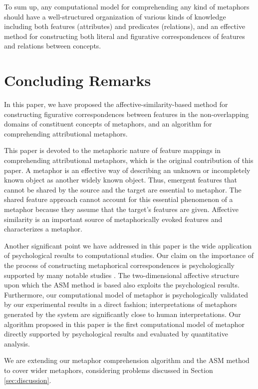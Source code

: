 To sum up, any computational model for comprehending any kind of
metaphors should have a well-structured organization of various kinds
of knowledge including both features (attributes) and predicates
(relations), and an effective method for constructing both literal and
figurative correspondences of features and relations between concepts.

\section{Concluding Remarks} \label{sec:conclusion}
In this paper, we have proposed the affective-similarity-based method
for constructing figurative correspondences between features 
in the non-overlapping domains of constituent concepts of metaphors,
and an algorithm for comprehending attributional metaphors.

This paper is devoted to the metaphoric nature of feature
mappings in comprehending attributional metaphors, which is the
original contribution of this paper.  A metaphor is an effective way
of describing an unknown or incompletely known object 
as another widely known object.  Thus,
emergent features that cannot be shared by the source and the target
are essential to metaphor. The shared feature approach cannot
account for this essential phenomenon of a metaphor because they
assume that the target's features are given.  Affective similarity
is an important source of metaphorically evoked features and
characterizes a metaphor. 

Another significant point we have addressed in this paper is the wide
application of psychological results to computational studies.  
Our claim on the importance of the process of constructing metaphorical 
correspondences is psychologically supported by many notable studies
\cite{Osgood80,Tourangeau82,Kusumi88,Tourangeau91}.
The two-dimensional affective structure upon which the ASM method is based 
also exploits the psychological results. 
Furthermore, our computational model of metaphor is psychologically validated 
by our experimental results in a direct fashion; 
interpretations of metaphors generated by the system are significantly close 
to human interpretations.
Our algorithm proposed in this paper is the first computational model of metaphor
directly supported by psychological results and evaluated by quantitative analysis.

We are extending our metaphor comprehension algorithm and the ASM method 
to cover wider metaphors, considering problems discussed in Section\,\ref{sec:discussion}.


